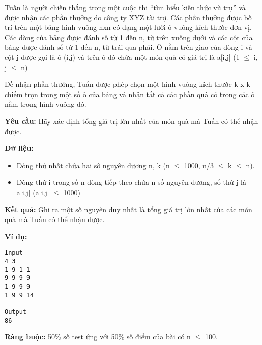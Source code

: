 

Tuấn là người chiến thắng trong một cuộc thi “tìm hiểu kiến thức vũ trụ” và được nhận các phần thưởng do công ty XYZ tài trợ. Các phần thưởng được bố trí trên một bảng hình vuông nxn \emph{} có dạng một lưới ô vuông kích thước đơn vị. Các dòng của bảng được đánh số từ 1 đến n, từ trên xuống dưới và các cột của bảng được đánh số từ 1 đến n, từ trái qua phải. Ô nằm trên giao của dòng i và cột j được gọi là ô (i,j) và trên ô đó chứa một món quà có giá trị là a[i,j] (1  $\le$  i, j  $\le$  n)

Đề nhận phần thưởng, Tuấn được phép chọn một hình vuông kích thước k x k chiếm trọn trong một số ô của bảng và nhận tất cả các phần quà có trong các ô nằm trong hình vuông đó.

\textbf{Yêu cầu: } Hãy xác định tổng giá trị lớn nhất của món quà mà Tuấn có thể nhận được.

\textbf{Dữ liệu: }
\begin{itemize}
	\item Dòng thứ nhất chứa hai sô nguyên dương n, k (n  $\le$  1000, n/3  $\le$  k  $\le$  n).
	\item Dòng thứ i trong số n dòng tiếp theo chứa n số nguyên dương, số thứ j là a[i,j] (a[i,j]  $\le$  1000)
\end{itemize}

\textbf{Kết quả: } Ghi ra một số nguyên duy nhất là tổng giá trị lớn nhất của các món quà mà Tuấn có thể nhận được.

\textbf{Ví dụ: }
\begin{verbatim}
Input
4 3
1 9 1 1
9 9 9 9
1 9 9 9
1 9 9 14

Output
86\end{verbatim}

\textbf{Ràng buộc: } 50\% số test ứng với 50\% số điểm của bài có n  $\le$  100.
